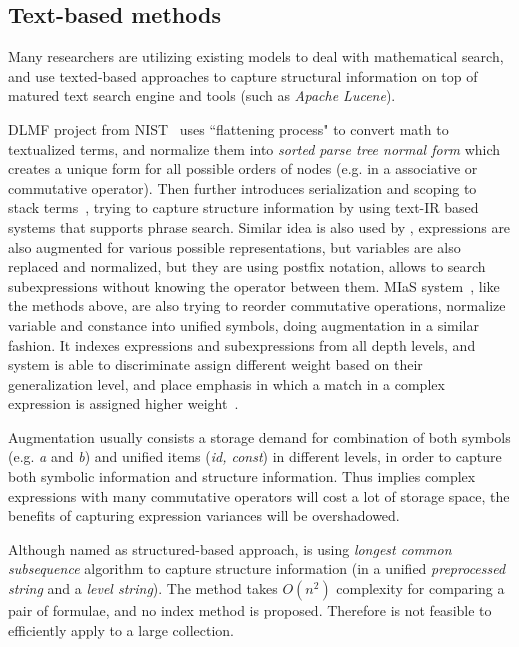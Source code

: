 \subsection{Text-based methods}
Many researchers are utilizing existing models to deal with mathematical search, and use texted-based approaches to capture structural information on top of matured text search engine and tools (such as \textit{Apache Lucene}). 

DLMF project from NIST~\cite{Youssef03} uses ``flattening process" to convert math to textualized terms, and normalize them into \textit{sorted parse tree normal form} which creates a unique form for all possible orders of nodes (e.g. in a associative or commutative operator). 
Then further introduces serialization and scoping to stack terms~\cite{Youssef05}, trying to capture structure information by using text-IR based systems that supports phrase search. 
Similar idea is also used by \cite{extending08}, expressions are also augmented for various possible representations, but variables are also replaced and normalized, but they are using postfix notation, allows to search subexpressions without knowing the operator between them.  
MIaS system~\cite{mias11a,mias11,mias:thesis}, like the methods above, are also trying to reorder commutative operations, normalize variable and constance into unified symbols, doing augmentation in a similar fashion. 
It indexes expressions and subexpressions from all depth levels, and system is able to discriminate assign different weight based on their generalization level, and place emphasis in which a match in a complex expression is assigned higher weight~\cite{mias:thesis}.

Augmentation usually consists a storage demand for combination of both symbols (e.g. \textit{a} and \textit{b}) and unified items (\textit{id, const}) in different levels, in order to capture both symbolic information and structure information. Thus implies complex expressions with many commutative operators will cost a lot of storage space, the benefits of capturing expression variances will be overshadowed.

Although named as structured-based approach, \cite{not-really-struct} is using \textit{longest common subsequence} algorithm to capture structure information (in a unified \textit{preprocessed string} and a \textit{level string}). The method takes $O(n^2)$ complexity for comparing a pair of formulae, and no index method is proposed. Therefore is not feasible to efficiently apply to a large collection.

